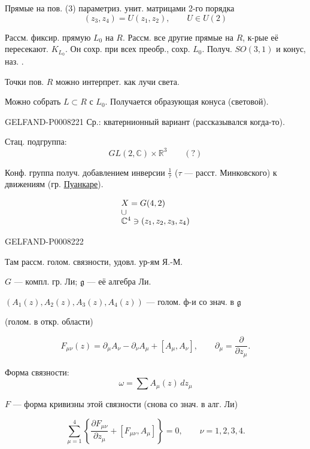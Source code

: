 Прямые на пов. (3) параметриз. унит. матрицами 2-го порядка
\[
(z_3,z_4)=U(z_1,z_2),\qquad U\in U(2)
\]


Рассм. фиксир. прямую \(L_0\) на \(R\). Рассм. все другие прямые на \(R\), к-рые её пересекают.
 \(K_{L_0}\). Он сохр. при всех преобр., сохр. \(L_0\).
Получ. \(SO(3,1)\) и конус, наз. .

Точки пов. \(R\) можно интерпрет. как лучи света.

Можно собрать  \(L\subset R\) с \(L_0\).
Получается образующая конуса (световой).


\begin{GelfandAdjacentEvidence}{GELFAND-P000822}{1}
Ср.: кватернионный вариант (рассказывался когда-то).

Стац. подгруппа:
\[
GL(2,\mathbb{C})\times\mathbb{R}^3\qquad(?)
\]

Конф. группа получ. добавлением инверсии \(\frac{1}{\tau}\) (\(\tau\) — расст. Минковского)
к движениям (гр. \uline{Пуанкаре}).

\[
\begin{array}{@{}l@{}}
X=G(4,2)\\[-.3ex]
\cup\\[-.3ex]
\mathbb{C}^4\ni(z_1,z_2,z_3,z_4)
\end{array}
\]
\end{GelfandAdjacentEvidence}
\begin{GelfandAdjacentEvidence}{GELFAND-P000822}{2}


Там рассм. голом. связности, удовл. ур-ям Я.-М.

\(G\) — компл. гр. Ли; \(\mathfrak g\) — её алгебра Ли.

\((A_1(z),A_2(z),A_3(z),A_4(z))\) — голом. ф-и со знач. в \(\mathfrak g\)

(голом. в откр. области)

\begin{equation*}
F_{\mu\nu}(z)=\partial_\mu A_\nu-\partial_\nu A_\mu+[A_\mu,A_\nu],
\qquad \partial_\mu=\frac{\partial}{\partial z_\mu}.
\tag{5}
\end{equation*}

Форма связности:
\[
\omega=\sum A_\mu(z)\,dz_\mu
\]

\(F\) — форма кривизны этой связности (снова со знач. в алг. Ли)

\begin{equation*}
\sum_{\mu=1}^{4}\left\{\frac{\partial F_{\mu\nu}}{\partial z_\mu}
 +[F_{\mu\nu},A_\mu]\right\}=0,\qquad \nu=1,2,3,4.
\tag{6}
\end{equation*}
\end{GelfandAdjacentEvidence}
